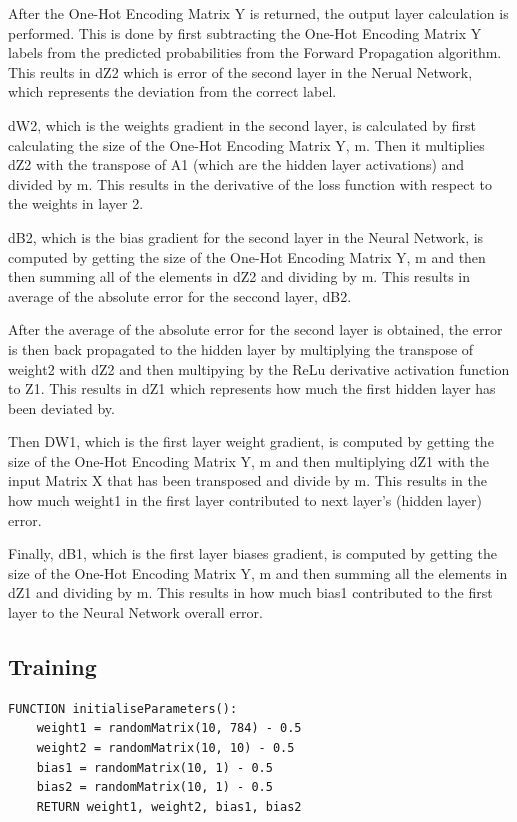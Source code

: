 \documentclass[11pt]{article}
\begin{document}
\vspace{1em}
After the One-Hot Encoding Matrix Y is returned, the output layer calculation is performed. This is done by first subtracting the One-Hot Encoding Matrix Y labels from the predicted probabilities from the Forward Propagation algorithm. This reults in dZ2 which is error of the second layer in the Nerual Network, which represents the deviation from the correct label.

\vspace{1em}
dW2, which is the weights gradient in the second layer, is calculated by first calculating the size of the One-Hot Encoding Matrix Y, m. Then it multiplies dZ2 with the transpose of A1 (which are the hidden layer activations) and divided by m. This results in the derivative of the loss function with respect to the weights in layer 2.

\vspace{1em}
dB2, which is the bias gradient for the second layer in the Neural Network, is computed by getting the size of the One-Hot Encoding Matrix Y, m and then then summing all of the elements in dZ2 and dividing by m. This results in average of the absolute error for the seccond layer, dB2.

\vspace{1em}
After the average of the absolute error for the second layer is obtained, the error is then back propagated to the hidden layer by multiplying the transpose of weight2 with dZ2 and then multipying by the ReLu derivative activation function to Z1. This results in dZ1 which represents how much the first hidden layer has been deviated by.

\vspace{1em}
Then DW1, which is the first layer weight gradient, is computed by getting the size of the One-Hot Encoding Matrix Y, m and then multiplying dZ1 with the input Matrix X that has been transposed and divide by m. This results in the how much weight1 in the first layer contributed to next layer's (hidden layer) error.

\vspace{1em}
Finally, dB1, which is the first layer biases gradient, is computed by getting the size of the One-Hot Encoding Matrix Y, m and then summing all the elements in dZ1 and dividing by m. This results in how much bias1 contributed to the first layer to the Neural Network overall error.

\subsection{Training}
\begin{lstlisting}[language={},mathescape=true, caption={Initialise Parameters Pseudocode}]
FUNCTION initialiseParameters():
    weight1 = randomMatrix(10, 784) - 0.5
    weight2 = randomMatrix(10, 10) - 0.5
    bias1 = randomMatrix(10, 1) - 0.5
    bias2 = randomMatrix(10, 1) - 0.5
    RETURN weight1, weight2, bias1, bias2
\end{lstlisting}
\end{document}
